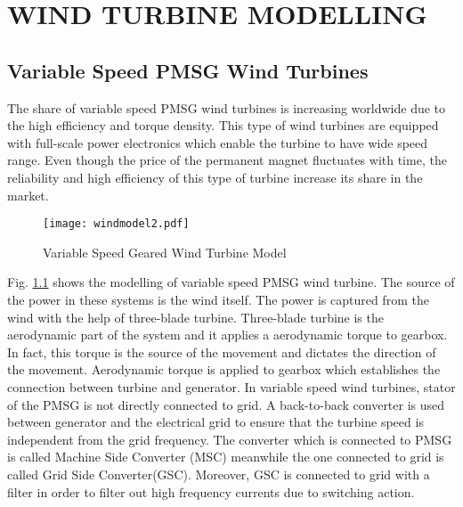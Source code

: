 \chapter{WIND TURBINE MODELLING}
\label{chp:3}
\section{Variable Speed PMSG Wind Turbines}
The share of variable speed PMSG wind turbines is increasing worldwide due to the high efficiency and torque density. This type of wind turbines are equipped with full-scale power electronics which enable the turbine to have wide speed range. Even though the price of the permanent magnet fluctuates with time, the reliability and high efficiency of this type of turbine increase its share in the market.\par
 \begin{figure}[h!]
	\centering
	\texttt{[image: windmodel2.pdf]}
	\caption{Variable Speed Geared Wind Turbine Model}
	\label{varspeedpmsg}
\end{figure} 
Fig. \ref{varspeedpmsg} shows the modelling of variable speed PMSG wind turbine. The source of the power in these systems is the wind itself. The power is captured from the wind with the help of three-blade turbine. Three-blade turbine is the aerodynamic part of the system and it applies a aerodynamic torque to gearbox. In fact, this torque is the source of the movement and dictates the direction of the movement. Aerodynamic torque is applied to gearbox which establishes the connection between turbine and generator. In variable speed wind turbines, stator of the PMSG is not directly connected to grid. A back-to-back converter is used between generator and the electrical grid to ensure that the turbine speed is independent from the grid frequency. The converter which is connected to PMSG is called Machine Side Converter (MSC) meanwhile the one connected to grid is called Grid Side Converter(GSC). Moreover, GSC is connected to grid with a filter in order to filter out high frequency currents due to switching action. 
